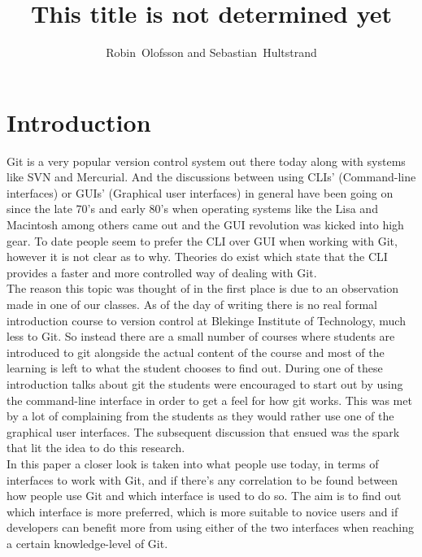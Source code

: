 \documentclass[a4paper,oneside]{bth} %
\begin{document}
		\tableofcontents 
		\listoffigures %
		
		\cleardoublepage
		\pagestyle{headings}
		
		\title{This title is not determined yet}
		\author{Robin~Olofsson and Sebastian~Hultstrand}
		
		\chapter{Introduction}
		Git is a very popular version control system out there today along with systems like SVN and Mercurial. And the discussions between using CLIs' (Command-line interfaces) or GUIs' (Graphical user interfaces) in general have been going on since the late 70's and early 80's when operating systems like the Lisa and Macintosh among others came out \cite{HistoryOfGUIWiki} and the GUI revolution was kicked into high gear.
		To date people seem to prefer the CLI over GUI when working with Git, however it is not clear as to why.
		Theories do exist which state that the CLI provides a faster and more controlled way of dealing with Git. \cite{GitUserSurvey}\cite{GitInClassroom}
		\\
		The reason this topic was thought of in the first place is due to an observation made in one of our classes. As of the day of writing there is no real formal introduction course to version control at Blekinge Institute of Technology, much less to Git. So instead there are a small number of courses where students are introduced to git alongside the actual content of the course and most of the learning is left to what the student chooses to find out.
		During one of these introduction talks about git the students were encouraged to start out by using the command-line interface in order to get a feel for how git works. This was met by a lot of complaining from the students as they would rather use one of the graphical user interfaces. The subsequent discussion that ensued was the spark that lit the idea to do this research.
		\\
		In this paper a closer look is taken into what people use today, in terms of interfaces to work with Git, and if there's any correlation to be found between how people use Git and which interface is used to do so.
		The aim is to find out which interface is more preferred, which is more suitable to novice users and if developers can benefit more from using either of the two interfaces when reaching a certain knowledge-level of Git.
\end{document}
